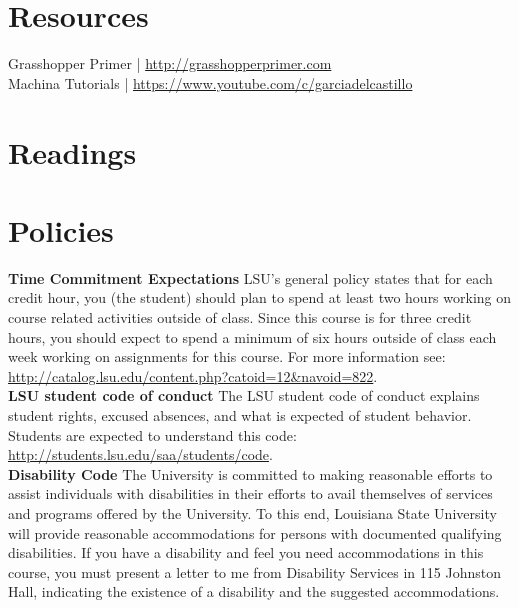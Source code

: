 \documentclass[11pt,article,oneside]{memoir}
\begin{document}
\clearpage

\section{Resources}
Grasshopper Primer | \url{http://grasshopperprimer.com}\\
Machina Tutorials | \url{https://www.youtube.com/c/garciadelcastillo}

\section{Readings}
\vspace*{0.5cm}
\nocite{*}
\setlength{}
\printbibliography[heading=none]
\clearpage

\section{Policies}

\noindent \textbf{Time Commitment Expectations}
LSU's general policy states that for each credit hour, you (the student) should plan to
spend at least two hours working on course related activities outside of class. Since this course is for three credit hours, you should expect to spend a minimum of six hours outside of class each week working on assignments for this course. For more information see: 
\url{http://catalog.lsu.edu/content.php?catoid=12&navoid=822}.\\

\noindent \textbf{LSU student code of conduct}
The LSU student code of conduct explains student rights, excused absences, and what is expected of student behavior. Students are expected to understand this code:  \url{http://students.lsu.edu/saa/students/code}.\\ %

\noindent \textbf{Disability Code}
The University is committed to making reasonable efforts to assist individuals with disabilities in
their efforts to avail themselves of services and programs offered by the University. To this end,
Louisiana State University will provide reasonable accommodations for persons with
documented qualifying disabilities. If you have a disability and feel you need accommodations in
this course, you must present a letter to me from Disability Services in 115 Johnston Hall,
indicating the existence of a disability and the suggested accommodations.\\
\end{document}
